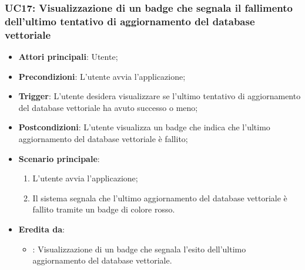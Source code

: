 \subsubsection{UC17: Visualizzazione di un badge che segnala il fallimento dell'ultimo tentativo di aggiornamento del database vettoriale}
\begin{itemize}
    \item \textbf{Attori principali}: Utente;
    \item \textbf{Precondizioni}: L'utente avvia l'applicazione;
    \item \textbf{Trigger}: L'utente desidera visualizzare se l'ultimo tentativo di aggiornamento del database vettoriale
    ha avuto successo o meno;
    \item \textbf{Postcondizioni}: L'utente visualizza un badge che indica che l'ultimo aggiornamento del database vettoriale
    è fallito;
    \item \textbf{Scenario principale}:
    \begin{enumerate}
        \item L'utente avvia l'applicazione;
        \item Il sistema segnala che l'ultimo aggiornamento del database vettoriale è fallito tramite un badge di colore rosso.
    \end{enumerate}
    \item \textbf{Eredita da}:
    \begin{itemize}
        \item {}: Visualizzazione di un badge che segnala l'esito dell'ultimo aggiornamento del database vettoriale.
    \end{itemize}
\end{itemize}

\hypertarget{UC20}{}
